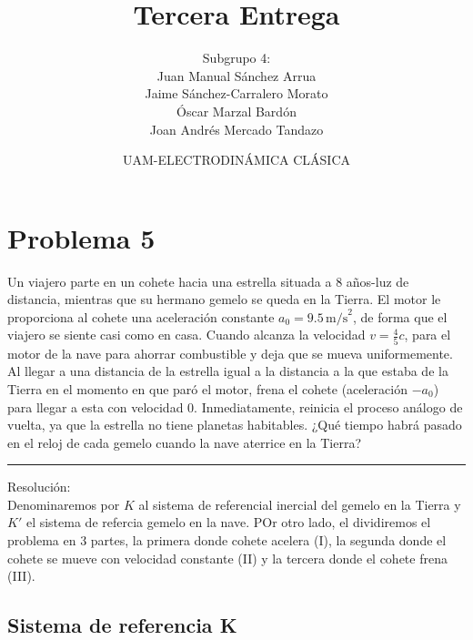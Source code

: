 \documentclass[11pt]{article}
\author{\Large \Large Subgrupo 4:\\ 
\Large Juan Manual Sánchez Arrua\\
 \Large Jaime Sánchez-Carralero Morato\\
 \Large Óscar Marzal Bardón\\
 \Large Joan Andrés Mercado Tandazo}
\date{\Large UAM-ELECTRODINÁMICA CLÁSICA}
\title{\huge \textbf{Tercera Entrega}}
\begin{document}
\maketitle
\brightmode
\section*{Problema 5}
Un viajero parte en un cohete hacia una estrella situada a 8 años-luz
de distancia, mientras que su hermano gemelo se queda en la Tierra.
El motor le proporciona al cohete una aceleración constante $a_0 = 9.5 \, \text{m/s}^2$, de forma que el viajero se siente casi como en casa. Cuando alcanza
la velocidad $v = \frac{4}{5} c$, para el motor de la nave para ahorrar combustible
y deja que se mueva uniformemente. Al llegar a una distancia de la
estrella igual a la distancia a la que estaba de la Tierra en el momento
en que paró el motor, frena el cohete (aceleración $-a_0$) para llegar a
esta con velocidad 0. Inmediatamente, reinicia el proceso análogo de
vuelta, ya que la estrella no tiene planetas habitables. ¿Qué tiempo
habrá pasado en el reloj de cada gemelo cuando la nave aterrice en la
Tierra?
\vspace*{1em}
\hrule
\vspace*{1em}
{\color{blue} Resolución:}\\
Denominaremos por $K$ al sistema de referencial inercial del gemelo en la Tierra y $K'$ el sistema de refercia gemelo en la nave. POr otro lado, el dividiremos el problema en 3 partes, la primera donde cohete acelera (I), la segunda donde el cohete se mueve con velocidad constante (II) y la tercera donde el cohete frena (III).\par

\subsection*{Sistema de referencia K}
\end{document}
